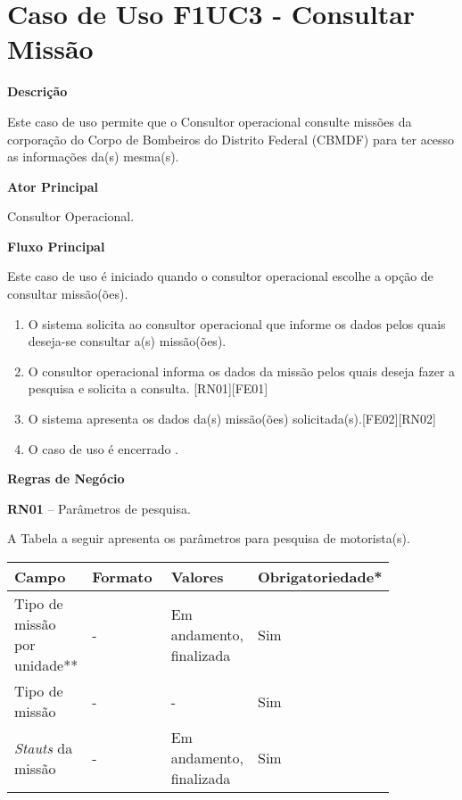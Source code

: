   \section{Caso de Uso F1UC3 - Consultar Missão}

  {\raggedright
      \textbf{Descrição}
  }
  
    Este caso de uso permite que o Consultor operacional consulte missões da corporação do Corpo de Bombeiros do Distrito Federal (CBMDF) para ter acesso as informações da(s) mesma(s).
  
  {\raggedright
      \textbf{Ator Principal}
  }

    Consultor Operacional.
  
  {\raggedright
      \textbf{Fluxo Principal}
  }
  
    Este caso de uso é iniciado quando o consultor operacional escolhe a opção de consultar  missão(ões).
    
  \begin{enumerate}
  \item O sistema solicita ao consultor operacional que informe os dados pelos quais deseja-se consultar a(s) missão(ões).
  \item O consultor operacional informa os dados da missão pelos quais deseja fazer a pesquisa e solicita a consulta. [RN01][FE01]
  \item O sistema apresenta os dados da(s) missão(ões) solicitada(s).[FE02][RN02]
  \item O caso de uso é encerrado .
  \end{enumerate}
  
   {\raggedright
      \textbf{Regras de Negócio}
   }
   
   \textbf{RN01} – Parâmetros de pesquisa.
   
   A Tabela a seguir apresenta os parâmetros para pesquisa de motorista(s).

   \begin{table*}[!h]
    \centering
      \begin{tabular}{|p{0.20\linewidth}|p{0.25\linewidth}|p{0.20\linewidth}|p{0.20\linewidth}|}
      \hline
      Campo  & Formato & Valores & Obrigatoriedade*\\
      \hline

      Tipo de missão por unidade** & - & Em andamento, finalizada & Sim\\\hline
      
      Tipo de missão & - & - & Sim\\\hline
      
      \textit{Stauts} da missão & - & Em andamento, finalizada & Sim\\\hline
      
      \hline
      \end{tabular}
    \end{table*}
      
